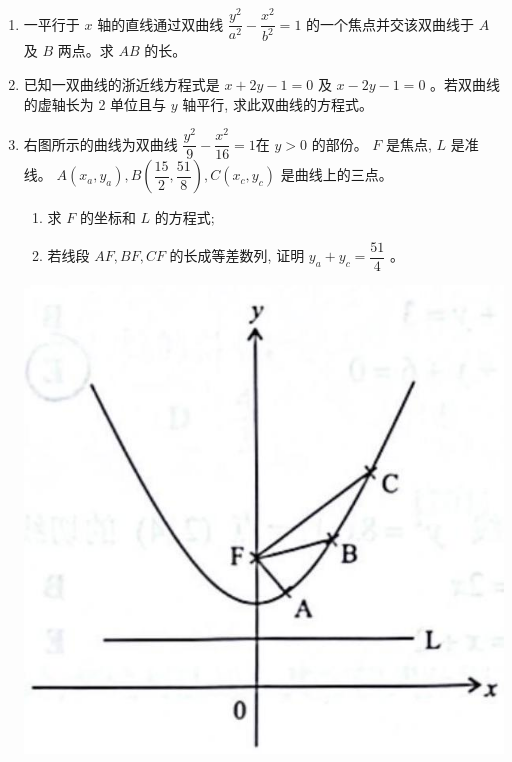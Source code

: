 \documentclass[10pt]{article}
\begin{document}
\begin{enumerate}
  \item 一平行于 $x$ 轴的直线通过双曲线 $\dfrac{y^{2}}{a^{2}}-\dfrac{x^{2}}{b^{2}}=1$ 的一个焦点并交该双曲线于 $A$ 及 $B$ 两点。求 $AB$ 的长。

  \item 已知一双曲线的浙近线方程式是 $x+2 y-1=0$ 及 $x-2 y-1=0$ 。若双曲线的虚轴长为 2 单位且与 $y$ 轴平行, 求此双曲线的方程式。

  \item 右图所示的曲线为双曲线 $\dfrac{y^{2}}{9}-\dfrac{x^{2}}{16}=1$在 $y>0$ 的部份。 $F$ 是焦点, $L$ 是准线。 $A\left(x_{a}, y_{a}\right), B\left(\dfrac{15}{2}, \dfrac{51}{8}\right), C\left(x_{c}, y_{c}\right)$ 是曲线上的三点。

  \begin{enumerate}
    \item 求 $F$ 的坐标和 $L$ 的方程式;

    \item 若线段 $AF, BF, CF$ 的长成等差数列, 证明 $y_{a}+y_{c}=\dfrac{51}{4}$ 。
  \end{enumerate}

\begin{center}
\includegraphics[max width=\textwidth]{2024_06_05_971e6815482d5ecd2718g-35}
\end{center}
\end{enumerate}
\end{document}
